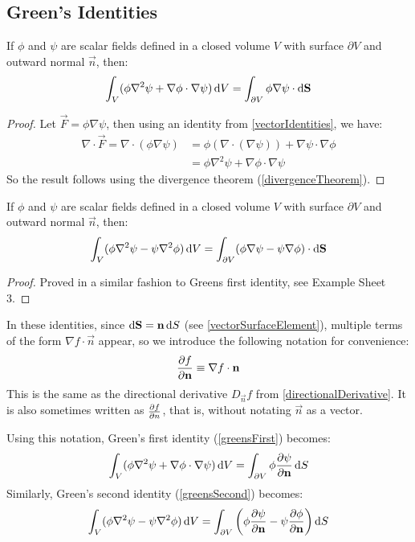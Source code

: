 \documentclass[../main.tex]{subfiles}
\begin{document}
\subsection{Green's Identities}
\label{greensIdentities}
\begin{theorem}
  If $\phi$ and $\psi$ are scalar fields defined in a closed volume $V$ with surface $\partial V$ and outward normal $\vec{n}$, then:
  \label{greensFirst}
  \[
    \int_{V} (\phi \nabla^2 \psi + \nabla \phi \cdot \nabla \psi) \d{V} = \int_{\partial V} \phi \nabla \psi \cdot \d{\vec{S}}
  \]
\end{theorem}
\begin{proof}
  Let $\vec{F} = \phi \nabla \psi$, then using an identity from \cref{vectorIdentities}, we have:
  \begin{align*}
    \nabla \cdot \vec{F} = \nabla \cdot (\phi \nabla \psi) &= \phi (\nabla \cdot (\nabla \psi)) + \nabla \psi \cdot \nabla \phi \\
                                                           &= \phi \nabla^2 \psi + \nabla \phi \cdot \nabla \psi
  \end{align*}
  So the result follows using the divergence theorem (\cref{divergenceTheorem}).
\end{proof}
\begin{theorem}
  If $\phi$ and $\psi$ are scalar fields defined in a closed volume $V$ with surface $\partial V$ and outward normal $\vec{n}$, then:
  \label{greensSecond}
  \[
    \int_{V} (\phi \nabla^2 \psi - \psi \nabla^2 \phi) \d{V} = \int_{\partial V} (\phi \nabla \psi - \psi \nabla \phi) \cdot \d{\vec{S}}
  \]
\end{theorem}
\begin{proof}
  Proved in a similar fashion to Greens first identity, see Example Sheet 3.
\end{proof}
\begin{remark}[Notation]
  In these identities, since $\d{\vec{S}} = \vec{n} \d{S}$ (see \cref{vectorSurfaceElement}), multiple terms of the form $\nabla f \cdot \vec{n}$ appear, so we introduce the following notation for convenience:
  \[
    \pderiv{f}{\vec{n}} \equiv \nabla f \cdot \vec{n}
  \]
  This is the same as the directional derivative $D_{\vec{n}}f$ from \cref{directionalDerivative}.
  It is also sometimes written as $\pderiv{f}{n}$, that is, without notating $\vec{n}$ as a vector.
\end{remark}
Using this notation, Green's first identity (\cref{greensFirst}) becomes:
\[
  \int_{V} (\phi \nabla^2 \psi + \nabla \phi \cdot \nabla \psi) \d{V} = \int_{\partial V} \phi \pderiv{\psi}{\vec{n}} \d{S}
\]
Similarly, Green's second identity (\cref{greensSecond}) becomes:
\[
  \int_{V} (\phi \nabla^2 \psi - \psi \nabla^2 \phi) \d{V} = \int_{\partial V} \left(\phi \pderiv{\psi}{\vec{n}} - \psi \pderiv{\phi}{\vec{n}}\right) \d{S}
\]
\end{document}
